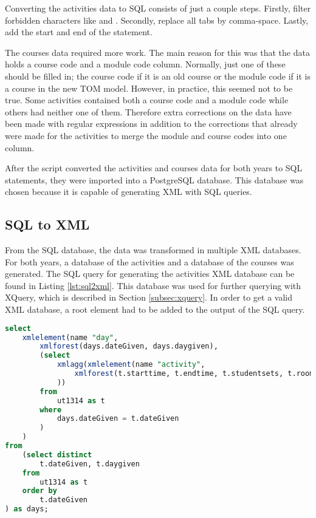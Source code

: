 Converting the activities data to SQL consists of just a couple steps. Firstly, filter forbidden characters like  and . Secondly,  replace all tabs by comma-space. Lastly, add the start and end of the  statement.

The courses data required more work. The main reason for this was that the data holds a course code and a module code column. Normally, just one of these should be filled in; the course code if it is an old course or the module code if it is a course in the new TOM model. However, in practice, this seemed not to be true. Some activities contained both a course code and a module code while others had neither one of them. Therefore extra corrections on the data have been made with regular expressions in addition to the corrections that already were made for the activities to merge the module and course codes into one column.

After the script converted the activities and courses data for both years to SQL statements, they were imported into a PostgreSQL database. This database was chosen because it is capable of generating XML with SQL queries.

\subsection{SQL to XML} \label{subsec:sql2xml}
From the SQL database, the data was transformed in multiple XML databases. For both years, a database of the activities and a database of the courses was generated. The SQL query for generating the activities XML database can be found in Listing \ref{lst:sql2xml}. This database was used for further querying with XQuery, which is described in Section \ref{subsec:xquery}. In order to get a valid XML database, a root element had to be added to the output of the SQL query.

\begin{lstlisting}[caption=SQL to XML conversion, label=lst:sql2xml, float=htpb, language=sql]
select
	xmlelement(name "day",
		xmlforest(days.dateGiven, days.daygiven),
		(select
			xmlagg(xmlelement(name "activity",
				xmlforest(t.starttime, t.endtime, t.studentsets, t.room, t.coursename, t.teacher)
			))
		from
			ut1314 as t
		where
			days.dateGiven = t.dateGiven
		)
	)
from
	(select distinct
		t.dateGiven, t.daygiven
	from
		ut1314 as t
	order by
		t.dateGiven
) as days;
\end{lstlisting}

